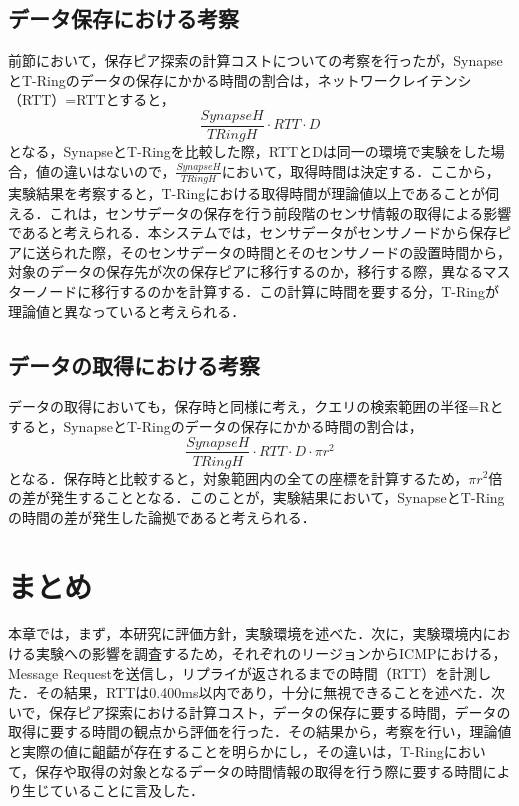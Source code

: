 \subsection{データ保存における考察}
前節において，保存ピア探索の計算コストについての考察を行ったが，SynapseとT-Ringのデータの保存にかかる時間の割合は，ネットワークレイテンシ（RTT）=RTTとすると，
\begin{equation}
\frac{SynapseH}{TRingH} \cdot RTT \cdot D \label{6}
\end{equation}
となる，SynapseとT-Ringを比較した際，RTTとDは同一の環境で実験をした場合，値の違いはないので，$\frac{SynapseH}{TRingH}$において，取得時間は決定する．ここから，実験結果を考察すると，T-Ringにおける取得時間が理論値以上であることが伺える．これは，センサデータの保存を行う前段階のセンサ情報の取得による影響であると考えられる．本システムでは，センサデータがセンサノードから保存ピアに送られた際，そのセンサデータの時間とそのセンサノードの設置時間から，対象のデータの保存先が次の保存ピアに移行するのか，移行する際，異なるマスターノードに移行するのかを計算する．この計算に時間を要する分，T-Ringが理論値と異なっていると考えられる．

\subsection{データの取得における考察}
データの取得においても，保存時と同様に考え，クエリの検索範囲の半径=Rとすると，SynapseとT-Ringのデータの保存にかかる時間の割合は，
\begin{equation}
\frac{SynapseH}{TRingH} \cdot RTT \cdot D \cdot  \pi r^{2}  \label{7}
\end{equation}
となる．保存時と比較すると，対象範囲内の全ての座標を計算するため，$\pi r^{2}$倍の差が発生することとなる．このことが，実験結果において，SynapseとT-Ringの時間の差が発生した論拠であると考えられる．

\section{まとめ}
本章では，まず，本研究に評価方針，実験環境を述べた．次に，実験環境内における実験への影響を調査するため，それぞれのリージョンからICMPにおける，Message Requestを送信し，リプライが返されるまでの時間（RTT）を計測した．その結果，RTTは0.400ms以内であり，十分に無視できることを述べた．次いで，保存ピア探索における計算コスト，データの保存に要する時間，データの取得に要する時間の観点から評価を行った．その結果から，考察を行い，理論値と実際の値に齟齬が存在することを明らかにし，その違いは，T-Ringにおいて，保存や取得の対象となるデータの時間情報の取得を行う際に要する時間により生じていることに言及した．